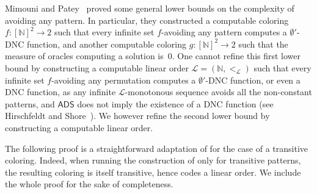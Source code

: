 \documentclass{article}
\newtheorem{theorem}{Theorem}
\numberwithin{theorem}{section}
\def\L{\mathcal{L}}
\newcommand{\ADS}[0]{\mathsf{ADS}}
\newcommand{\NN}[0]{\mathbb{N}}
\begin{document}
Mimouni and Patey~\cite{mimouni2025ramseylike} proved some general lower bounds on the complexity of avoiding any pattern. In particular, they constructed a computable coloring $f : [\NN]^2 \to 2$ such that every infinite set $f$-avoiding any pattern computes a $\emptyset'$-DNC function, and another computable coloring $g : [\NN]^2 \to 2$ such that the measure of oracles computing a solution is~0. One cannot refine this first lower bound by constructing a computable linear order $\L = (\NN, <_\L)$ such that every infinite set $f$-avoiding any permutation computes a $\emptyset'$-DNC function, or even a DNC function, as any infinite $\L$-monotonous sequence avoids all the non-constant patterns, and $\ADS$ does not  imply the existence of a DNC function (see Hirschfeldt and Shore~\cite{hirschfeldt2007combinatorial}). We however refine the second lower bound by constructing a computable linear order.

The following proof is a straightforward adaptation of \cite[Theorem 2.2]{mimouni2025ramseylike} for the case of a transitive coloring. Indeed, when running the construction of \cite[Theorem 2.2]{mimouni2025ramseylike} only for transitive patterns, the resulting coloring is itself transitive, hence codes a linear order. We include the whole proof for the sake of completeness.

\end{document}
